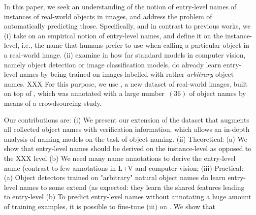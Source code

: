 In this paper, we seek an understanding of the notion of entry-level names of instances of real-world objects in images, and address the problem of automatically predicting those. %
Specifically, and in contrast to previous works, we 
(i) take on an empirical notion of entry-level names, and define it on the instance-level, i.e., the name that humans prefer to use when calling a particular object in a real-world image. 
(ii) examine in how far standard models in computer vision, namely object detection or image classification models, do already learn entry-level names by being trained on images labelled with rather \textit{arbitrary} object names. XXX
For this purpose, we use \mn, a new dataset of real-world images, built on top of \vg, which was  annotated with a large number\ $(36)$ of object names by means of a crowdsourcing study. 

Our contributions are: 
(i) We present our extension of the \mn dataset that augments all collected object names with verification information, which allows an in-depth analysis of naming models on the task of object naming. 
(ii) Theoretical:
(a) We show that entry-level names should be derived on the instance-level as opposed to the XXX level 
(b) We need many name annotations to derive the entry-level name (contrast to few annotations in L+V and computer vision; 
(iii) Practical:
(a) Object detectors trained on "arbitrary" natural object names do learn entry-level names to some extend (as expected: they learn the shared features leading to entry-level 
(b) To predict entry-level names without annotating a huge amount of training examples, it is possible to fine-tune (iii) on \mn. We show that 

